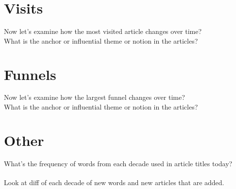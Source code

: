 \documentclass[11pt]{article}
\begin{document}
\section{Visits}
Now let's examine how the most visited article changes over time?\\
What is the anchor or influential theme or notion in the articles?

\section{Funnels}
Now let's examine how the largest funnel changes over time?\\
What is the anchor or influential theme or notion in the articles?

\section{Other}

What's the frequency of words from each decade used in article titles today?
\\\\
Look at diff of each decade of new words and new articles that are added.
\end{document}
